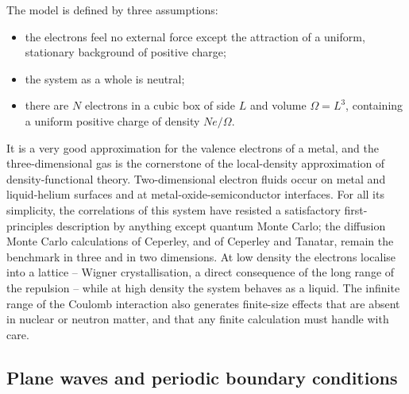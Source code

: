 The model is defined by three assumptions:
\begin{itemize}
  \item the electrons feel no external force except the attraction of a
    uniform, stationary background of positive charge;
  \item the system as a whole is neutral;
  \item there are $N$ electrons in a cubic box of side $L$ and volume
    $\Omega=L^3$, containing a uniform positive charge of density $Ne/\Omega$.
\end{itemize}
It is a very good approximation for the valence electrons of a metal, and the
three-dimensional gas is the cornerstone of the local-density approximation of
density-functional theory.  Two-dimensional electron fluids occur on metal and
liquid-helium surfaces and at metal-oxide-semiconductor interfaces.  For all
its simplicity, the correlations of this system have resisted a satisfactory
first-principles description by anything except quantum Monte Carlo; the
diffusion Monte Carlo calculations of Ceperley, and of Ceperley and Tanatar,
remain the benchmark in three and in two dimensions.  At low density the
electrons localise into a lattice -- Wigner crystallisation, a direct
consequence of the long range of the repulsion -- while at high density the
system behaves as a liquid.  The infinite range of the Coulomb interaction
also generates finite-size effects that are absent in nuclear or neutron
matter, and that any finite calculation must handle with care.

\subsection{Plane waves and periodic boundary conditions}
\label{sec:egbasis}

